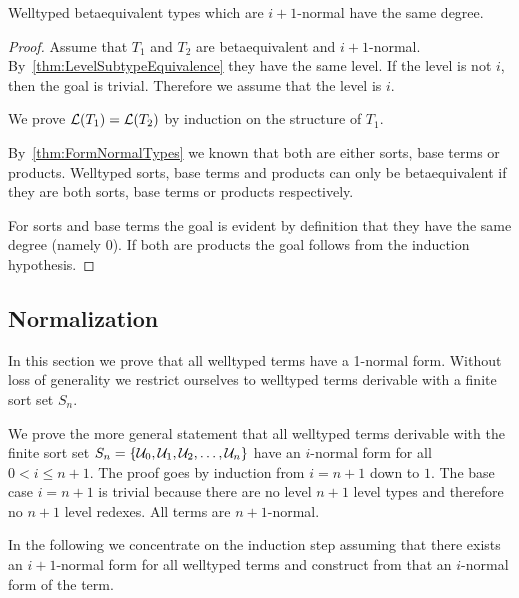\begin{theorem}
    Welltyped betaequivalent types which are $i+1$-normal have the same degree.
    \label{thm:BetaEquivalentSameDegree}
    \begin{proof}
        Assume that $T_1$ and $T_2$ are betaequivalent and $i+1$-normal.
        By~\ref{thm:LevelSubtypeEquivalence} they have the same level. If the
        level is not $i$, then the goal is trivial. Therefore we assume that the
        level is $i$.

        We prove ${\cal L}(T_1) = {\cal L}(T_2)$ by induction on the structure of
        $T_1$.

        By~\ref{thm:FormNormalTypes} we known that both are either sorts, base
        terms or products. Welltyped sorts, base terms and products can only be
        betaequivalent if they are both sorts, base terms or products respectively.


        For sorts and base terms the goal is evident by definition that
        they have the same degree (namely 0). If both are products the goal
        follows from the induction hypothesis.
    \end{proof}
\end{theorem}









\subsection{Normalization}

In this section we prove that all welltyped terms have a 1-normal form. Without
loss of generality we restrict ourselves to welltyped terms derivable with a
finite sort set $S_n$.

We prove the more general statement that all welltyped terms derivable with the
finite sort set $S_n = {\left\{{\cal U}_0, {\cal U}_1, {\cal U}_2, \ldots, {\cal U}_n\right\}}$ have an
$i$-normal form for all $0 < i \le n + 1$. The proof goes by induction from $i =
n+1$ down to $1$. The base case $i = n + 1$ is trivial because there are no
level $n+1$ level types and therefore no $n+1$ level redexes. All terms are
$n+1$-normal.

In the following we concentrate on the induction step assuming that there exists
an $i+1$-normal form for all welltyped terms and construct from that an
$i$-normal form of the term.

